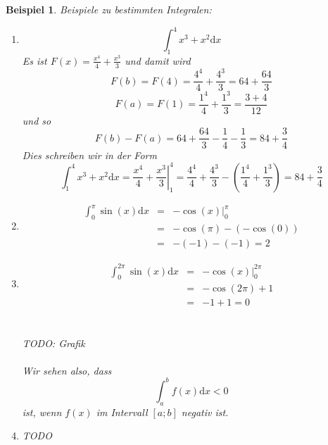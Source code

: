 \documentclass{report}
\newtheorem{myexample}{Beispiel}
\begin{document}
\begin{myexample}Beispiele zu bestimmten Integralen:
\begin{enumerate}
\item \begin{equation}\int_1^4 x^3 + x^2\mathrm{d}x\end{equation}
Es ist $F(x) = \frac{x^4}{4} + \frac{x^3}{3}$ und damit wird
\begin{equation}F(b) = F(4) = \frac{4^4}{4} + \frac{4^3}{3} = 64 + \frac{64}{3}\end{equation}
\begin{equation}F(a) = F(1) = \frac{1^4}{4} + \frac{1^3}{3} = \frac{3 + 4}{12}\end{equation}
und so
\begin{equation}F(b)-F(a) = 64 + \frac{64}{3} - \frac{1}{4} - \frac{1}{3} = 84 + \frac{3}{4}\end{equation}
Dies schreiben wir in der Form
\begin{equation}\int_1^4 x^3 + x^2 \mathrm{d}x = \left. \frac{x^4}{4} + \frac{x^3}{3} \right|^{4}_{1} = \frac{4^4}{4} + \frac{4^3}{3} - (\frac{1^4}{4} + \frac{1^3}{3}) = 84 + \frac{3}{4}\end{equation}
\item \begin{eqnarray}\int_0^{\pi} \sin(x) \mathrm{d}x & = & \left. -\cos(x) \right|^{\pi}_0 \nonumber \\
& = & -\cos(\pi) - (-\cos(0)) \nonumber \\
& = & - (-1) - (-1) = 2\end{eqnarray}
\item \begin{eqnarray} \int_0^{2 \pi} \sin(x) \mathrm{d}x & = &  \left. -\cos(x) \right|^{2 \pi}_0 \nonumber \\
& = & -\cos(2 \pi) + 1 \nonumber \\
& = & -1 + 1 = 0 \end{eqnarray}
\\\\TODO: Grafik\\\\
Wir sehen also, dass
\begin{equation}\int_a^b f(x) \mathrm{d}x < 0\end{equation}
ist, wenn $f(x)$ im Intervall $[a;b]$ negativ ist.
\item TODO
\end{enumerate}\end{myexample}
\end{document}
